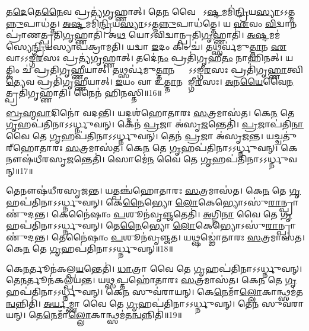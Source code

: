 𑌤\ul{𑌦𑍇}𑌤𑍇\ul{𑌨𑍈}𑌵 𑌪𑍍𑌰𑌤𑍍𑌯॑𑌗𑍃𑌹𑍍𑌣𑌾𑌤𑍍।
𑌤𑍇\ul{𑌨} 𑌵𑍈 𑌸𑍋᳚\-𑌽\ul{𑌷𑍍𑌟}𑌮𑌮𑌿॑\ul{𑌨𑍍𑌦𑍍𑌰𑌿}𑌯\-\ul{𑌸𑍍𑌯𑌾}\-𑌽𑌽𑌤𑍍𑌮\ul{𑌨𑍍𑌨𑍁}𑌪𑌾\-𑌧॑𑌤𑍍𑌤।
\ul{𑌅}\ul{𑌷𑍍𑌟}𑌮𑌮𑌿॑\ul{𑌨𑍍𑌦𑍍𑌰𑌿}𑌯\-\ul{𑌸𑍍𑌯𑌾}\-𑌽𑌽𑌤𑍍𑌮\ul{𑌨𑍍𑌨𑍁}𑌪𑌾\-𑌧॑𑌤𑍍𑌤𑍇।
𑌯 \ul{𑌏}𑌵𑌂 \ul{𑌵𑌿}𑌦𑍍𑌵𑌾𑌨𑌪𑍍𑌰𑌾॑𑌣𑌤𑍍𑌪𑍍𑌰𑌤𑌿\-\ul{𑌗𑍃}𑌹𑍍𑌣𑌾𑌤𑌿॑।
𑌅\ul{𑌥} 𑌯𑍋𑌽𑌵𑌿॑𑌦𑍍𑌵𑌾𑌨𑍍𑌪𑍍𑌰𑌤𑌿\-\ul{𑌗𑍃}𑌹𑍍𑌣𑌾𑌤𑌿॑।
\ul{𑌅}\ul{𑌷𑍍𑌟}𑌮\-𑌮॑𑌸𑍍𑌯𑍇\ul{𑌨𑍍𑌦𑍍𑌰𑌿}𑌯\-𑌸𑍍𑌯𑌾𑌪॑\-𑌕𑍍𑌰𑌾𑌮𑌤𑌿।
𑌯𑌦𑍍𑌵𑌾 \ul{𑌇}𑌦𑌂 𑌕𑌿𑌂 𑌚॑।
𑌤𑌥𑍍𑌸𑌰𑍍𑌵॑𑌮𑍁\ul{𑌤𑍍𑌤𑌾}𑌨 \ul{𑌏}𑌵𑌾\-𑌽𑌽𑌙𑍍𑌗𑍀॑\ul{𑌰}𑌸𑌃 𑌪𑍍𑌰𑌤𑍍𑌯॑\-𑌗𑍃𑌹𑍍𑌣𑌾𑌤𑍍।
𑌤𑌦𑍇॑\ul{𑌨𑌂} 𑌪𑍍𑌰𑌤𑌿॑\-𑌗𑍃𑌹𑍀\ul{𑌤𑌂} 𑌨𑌾𑌹𑌿॑𑌨𑌤𑍍।
𑌯𑌤𑍍𑌕𑌿𑌂 𑌚॑ 𑌪𑍍𑌰𑌤𑌿\-𑌗𑍃\ul{𑌹𑍍𑌣𑍀}𑌯𑌾𑌤𑍍।
𑌤𑌥𑍍𑌸𑌰𑍍𑌵॑𑌮𑍁\ul{𑌤𑍍𑌤𑌾}𑌨𑌸𑍍𑌤𑍍𑌵𑌾᳚\-𑌽𑌽𑌙𑍍𑌗𑍀\ul{𑌰}𑌸𑌃 𑌪𑍍𑌰𑌤𑌿॑\-𑌗𑍃\ul{𑌹𑍍𑌣𑌾}𑌤𑍍𑌵𑌿\ul{𑌤𑍍𑌯𑍇}𑌵 𑌪𑍍𑌰𑌤𑌿॑\-𑌗𑍃𑌹𑍍𑌣𑍀𑌯𑌾𑌤𑍍।
\ul{𑌇}𑌯𑌂 𑌵𑌾 𑌉॑\ul{𑌤𑍍𑌤𑌾}𑌨 𑌆᳚𑌙𑍍𑌗𑍀\ul{𑌰}𑌸𑌃।
\ul{𑌅}𑌨\ul{𑌯𑍈}𑌵𑍈\ul{𑌨}𑌤𑍍𑌪𑍍𑌰𑌤𑌿॑\-𑌗𑍃𑌹𑍍𑌣𑌾𑌤𑌿।
𑌨𑍈𑌨॑ 𑌹𑌿𑌨𑌸𑍍𑌤𑌿॥16॥

\ul{𑌬𑍍𑌰}\ul{𑌹𑍍𑌮}\ul{𑌵𑌾}𑌦𑌿𑌨𑍋॑ 𑌵𑌦𑌨𑍍𑌤𑌿।
𑌯𑌦𑍍𑌦𑌶॑𑌹𑍋𑌤𑌾𑌰𑌃 \ul{𑌸}𑌤𑍍𑌰𑌮𑌾𑌸॑𑌤।
𑌕𑍇\ul{𑌨} 𑌤𑍇 \ul{𑌗𑍃}𑌹𑌪॑𑌤𑌿𑌨𑌾\-𑌽𑌽𑌰𑍍𑌧𑍍𑌨𑍁𑌵𑌨𑍍।
𑌕𑍇𑌨॑ \ul{𑌪𑍍𑌰}𑌜𑌾 𑌅॑𑌸𑍃\ul{𑌜}𑌨𑍍𑌤𑍇𑌤𑌿॑।
\ul{𑌪𑍍𑌰}𑌜𑌾𑌪॑𑌤𑌿\ul{𑌨𑌾} 𑌵𑍈 𑌤𑍇 \ul{𑌗𑍃}𑌹𑌪॑𑌤𑌿𑌨𑌾\-𑌽𑌽𑌰𑍍𑌧𑍍𑌨𑍁𑌵𑌨𑍍।
𑌤𑍇𑌨॑ \ul{𑌪𑍍𑌰}𑌜𑌾 𑌅॑𑌸𑍃𑌜𑌨𑍍𑌤।
𑌯𑌚𑍍𑌚𑌤𑍁॑𑌰𑍍‌\mbox{}𑌹𑍋𑌤𑌾𑌰𑌃 \ul{𑌸}𑌤𑍍𑌰𑌮𑌾𑌸॑𑌤।
𑌕𑍇\ul{𑌨} 𑌤𑍇 \ul{𑌗𑍃}𑌹𑌪॑𑌤𑌿𑌨𑌾\-𑌽𑌽𑌰𑍍𑌧𑍍𑌨𑍁𑌵𑌨𑍍।
𑌕𑍇𑌨𑍗𑌷॑𑌧𑍀𑌰𑌸𑍃\ul{𑌜}𑌨𑍍𑌤𑍇𑌤𑌿॑।
𑌸𑍋𑌮𑍇॑\ul{𑌨} 𑌵𑍈 𑌤𑍇 \ul{𑌗𑍃}𑌹𑌪॑𑌤𑌿𑌨𑌾\-𑌽𑌽𑌰𑍍𑌧𑍍𑌨𑍁𑌵𑌨𑍍॥17॥

𑌤𑍇𑌨𑍗𑌷॑𑌧𑍀𑌰𑌸𑍃𑌜𑌨𑍍𑌤।
𑌯𑌤𑍍𑌪𑌞𑍍𑌚॑𑌹𑍋𑌤𑌾𑌰𑌃 \ul{𑌸}𑌤𑍍𑌰𑌮𑌾𑌸॑𑌤।
𑌕𑍇\ul{𑌨} 𑌤𑍇 \ul{𑌗𑍃}𑌹𑌪॑𑌤𑌿𑌨𑌾\-𑌽𑌽𑌰𑍍𑌧𑍍𑌨𑍁𑌵𑌨𑍍।
𑌕𑍇\ul{𑌨𑍈}𑌭𑍍𑌯𑍋 \ul{𑌲𑍋}𑌕𑍇𑌭𑍍𑌯𑍋\-𑌽𑌸𑍁॑\ul{𑌰𑌾}𑌨𑍍𑌪𑍍𑌰𑌾𑌣𑍁॑𑌦𑌨𑍍𑌤।
𑌕𑍇𑌨𑍈॑𑌷𑌾𑌂 \ul{𑌪}𑌶𑍂𑌨॑𑌵𑍃\ul{𑌞𑍍𑌜}𑌤𑍇𑌤𑌿॑।
\ul{𑌅}𑌗𑍍𑌨𑌿\ul{𑌨𑌾} 𑌵𑍈 𑌤𑍇 \ul{𑌗𑍃}𑌹𑌪॑𑌤𑌿𑌨𑌾\-𑌽𑌽𑌰𑍍𑌧𑍍𑌨𑍁𑌵𑌨𑍍।
𑌤𑍇\ul{𑌨𑍈}𑌭𑍍𑌯𑍋 \ul{𑌲𑍋}𑌕𑍇𑌭𑍍𑌯𑍋\-𑌽𑌸𑍁॑\ul{𑌰𑌾}𑌨𑍍𑌪𑍍𑌰𑌾𑌣𑍁॑𑌦𑌨𑍍𑌤।
𑌤𑍇𑌨𑍈॑𑌷𑌾𑌂 \ul{𑌪}𑌶𑍂𑌨॑𑌵𑍃𑌞𑍍𑌜𑌤।
𑌯𑌥𑍍𑌷𑌡𑍍𑌢𑍋॑𑌤𑌾𑌰𑌃 \ul{𑌸}𑌤𑍍𑌰𑌮𑌾𑌸॑𑌤।
𑌕𑍇\ul{𑌨} 𑌤𑍇 \ul{𑌗𑍃}𑌹𑌪॑𑌤𑌿𑌨𑌾\-𑌽𑌽𑌰𑍍𑌧𑍍𑌨𑍁𑌵𑌨𑍍॥18॥

𑌕𑍇\ul{𑌨}𑌰𑍍𑌤𑍂𑌨॑𑌕𑌲𑍍𑌪\ul{𑌯}𑌨𑍍𑌤𑍇𑌤𑌿॑।
\ul{𑌧𑌾}𑌤𑍍𑌰𑌾 𑌵𑍈 𑌤𑍇 \ul{𑌗𑍃}𑌹𑌪॑𑌤𑌿𑌨𑌾\-𑌽𑌽𑌰𑍍𑌧𑍍𑌨𑍁𑌵𑌨𑍍।
𑌤𑍇\ul{𑌨}𑌰𑍍𑌤𑍂𑌨॑𑌕𑌲𑍍𑌪𑌯𑌨𑍍𑌤।
𑌯\ul{𑌥𑍍𑌸}𑌪𑍍𑌤𑌹𑍋॑𑌤𑌾𑌰𑌃 \ul{𑌸}𑌤𑍍𑌰𑌮𑌾𑌸॑𑌤।
𑌕𑍇\ul{𑌨} 𑌤𑍇 \ul{𑌗𑍃}𑌹𑌪॑𑌤𑌿𑌨𑌾\-𑌽𑌽𑌰𑍍𑌧𑍍𑌨𑍁𑌵𑌨𑍍।
𑌕𑍇\ul{𑌨} 𑌸𑍁𑌵॑𑌰𑌾𑌯𑌨𑍍।
𑌕𑍇\ul{𑌨𑍇}𑌮𑌾𑌁\ul{𑌲𑍍𑌲𑍋}𑌕𑌾𑌨𑍍𑌥𑍍𑌸𑌮॑\-𑌤\ul{𑌨𑍍𑌵}𑌨𑍍𑌨𑌿𑌤𑌿॑।
\ul{𑌅}\ul{𑌰𑍍𑌯}𑌮𑍍𑌣𑌾 𑌵𑍈 𑌤𑍇 \ul{𑌗𑍃}𑌹𑌪॑𑌤𑌿𑌨𑌾\-𑌽𑌽𑌰𑍍𑌧𑍍𑌨𑍁𑌵𑌨𑍍।
𑌤𑍇\ul{𑌨} 𑌸𑍁𑌵॑𑌰𑌾𑌯𑌨𑍍।
𑌤𑍇\ul{𑌨𑍇}𑌮𑌾𑌁\ul{𑌲𑍍𑌲𑍋}𑌕𑌾𑌨𑍍𑌥𑍍𑌸𑌮॑𑌤\ul{𑌨𑍍𑌵}𑌨𑍍𑌨𑌿𑌤𑌿॑॥19॥

